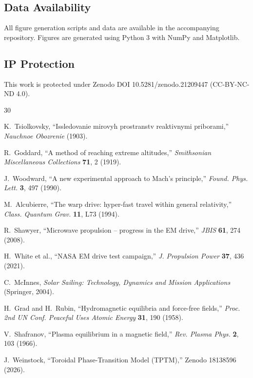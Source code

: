 \documentclass[12pt,a4paper]{article}
\begin{document}
\subsection*{Data Availability}
All figure generation scripts and data are available in the accompanying repository. Figures are generated using Python 3 with NumPy and Matplotlib.

\subsection*{IP Protection}
This work is protected under Zenodo DOI 10.5281/zenodo.21209447 (CC-BY-NC-ND 4.0).

\begin{thebibliography}{30}

K.~Tsiolkovsky, ``Issledovanie mirovyh prostranstv reaktivnymi priborami,'' \textit{Nauchnoe Obozrenie} (1903).

R.~Goddard, ``A method of reaching extreme altitudes,'' \textit{Smithsonian Miscellaneous Collections} \textbf{71}, 2 (1919).

J.~Woodward, ``A new experimental approach to Mach's principle,'' \textit{Found. Phys. Lett.} \textbf{3}, 497 (1990).

M.~Alcubierre, ``The warp drive: hyper-fast travel within general relativity,'' \textit{Class. Quantum Grav.} \textbf{11}, L73 (1994).

R.~Shawyer, ``Microwave propulsion -- progress in the EM drive,'' \textit{JBIS} \textbf{61}, 274 (2008).

H.~White et al., ``NASA EM drive test campaign,'' \textit{J. Propulsion Power} \textbf{37}, 436 (2021).

C.~McInnes, \textit{Solar Sailing: Technology, Dynamics and Mission Applications} (Springer, 2004).

H.~Grad and H.~Rubin, ``Hydromagnetic equilibria and force-free fields,'' \textit{Proc. 2nd UN Conf. Peaceful Uses Atomic Energy} \textbf{31}, 190 (1958).

V.~Shafranov, ``Plasma equilibrium in a magnetic field,'' \textit{Rev. Plasma Phys.} \textbf{2}, 103 (1966).

J.~Weinstock, ``Toroidal Phase-Transition Model (TPTM),'' Zenodo 18138596 (2026).


\end{thebibliography}
\end{document}
